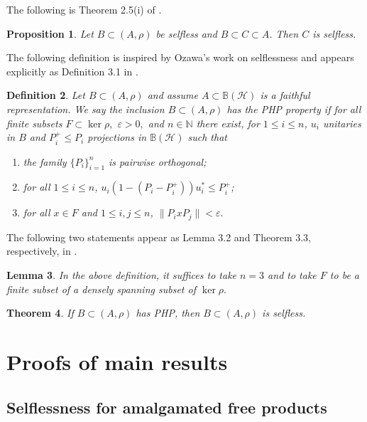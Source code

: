 \documentclass{amsart}
\newtheorem{theorem}{Theorem}[section]
\newtheorem{lemma}[theorem]{Lemma}
\newtheorem{proposition}[theorem]{Proposition}
\newtheorem{definition}[theorem]{Definition}
\theoremstyle{definition}
\newcommand{\N}{\mathbb{N}}
\begin{document}
The following is Theorem 2.5(i) of \cite{hayes2025selfless}.

\begin{proposition}
    Let $B\subset (A,\rho)$ be selfless and $B\subset C\subset A$. Then $C$ is selfless.
\end{proposition}

The following definition is inspired by Ozawa's work on selflessness \cite{ozawa2025proximalityselflessnessgroupcalgebras} and appears explicitly as Definition 3.1 in \cite{hayes2025selfless}.

\begin{definition}
    Let $B\subset (A,\rho)$ and assume $A\subset \mathbb B(\mathcal H)$ is a faithful representation. We say the inclusion $B\subset (A,\rho)$ has the PHP property if for all finite subsets $F\subset \ker \rho,$ $\varepsilon>0,$ and $n\in\N$ there exist, for $1\le i\le n$, $u_i$ unitaries in $B$ and $P_i^+\le P_i$ projections in $\mathbb B(\mathcal H)$ such that 
    \begin{enumerate}
        \item the family $\{P_i\}_{i=1}^n$ is pairwise orthogonal;
        \item for all $1\le i\le n$, $u_i(1-(P_i-P_i^+))u_i^* \le P_i^+$;
        \item for all $x\in F$ and $1\le i,j\le n$, $\|P_ixP_j\| < \varepsilon.$
    \end{enumerate}
\end{definition}

The following two statements appear as Lemma 3.2 and Theorem 3.3, respectively, in \cite{hayes2025selfless}.

\begin{lemma}\label{lem: php n is 3}
    In the above definition, it suffices to take $n=3$ and to take $F$ to be a finite subset of a densely spanning subset of $\ker \rho.$
\end{lemma}

\begin{theorem}\label{thm: php-implies-selfless}
    If $B\subset(A,\rho)$ has PHP, then $B\subset (A,\rho)$ is selfless.
\end{theorem}

\section{Proofs of main results}


\subsection{Selflessness for amalgamated free products}
\end{document}
